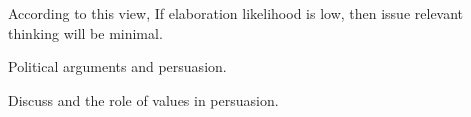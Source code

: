 


According to this view, If elaboration likelihood is low, then issue relevant thinking will be minimal.

\citet{cobb1997changing} Political arguments and persuasion.



Discuss \citet{nelson2005values} and the role of values in persuasion.

